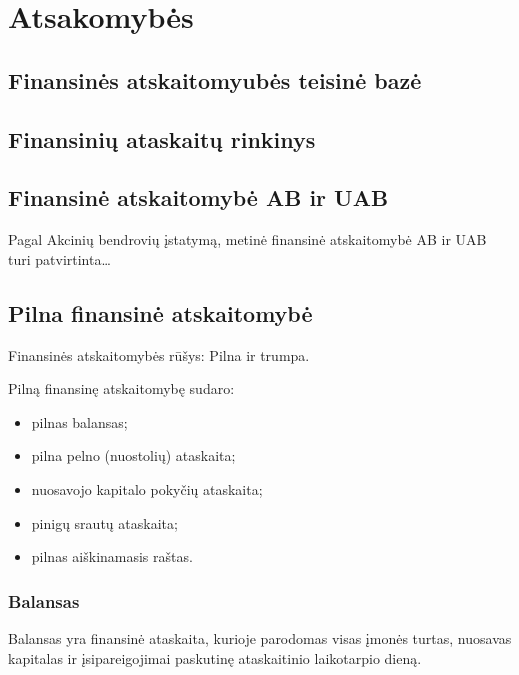 \chapter{Atsakomybės}


\section{Finansinės atskaitomyubės teisinė bazė}


\section{Finansinių ataskaitų rinkinys}


\section{Finansinė atskaitomybė AB ir UAB}


Pagal Akcinių bendrovių įstatymą, metinė finansinė atskaitomybė AB
ir UAB turi patvirtinta…

\section{Pilna finansinė atskaitomybė}


Finansinės atskaitomybės rūšys: Pilna ir trumpa.

Pilną finansinę atskaitomybę sudaro:
\begin{itemize}
  \item pilnas balansas;
  \item pilna pelno (nuostolių) ataskaita;
  \item nuosavojo kapitalo pokyčių ataskaita;
  \item pinigų srautų ataskaita;
  \item pilnas aiškinamasis raštas.
\end{itemize}

\subsection{Balansas}


Balansas yra finansinė ataskaita, kurioje parodomas visas įmonės turtas,
nuosavas kapitalas ir įsipareigojimai paskutinę ataskaitinio laikotarpio
dieną.

